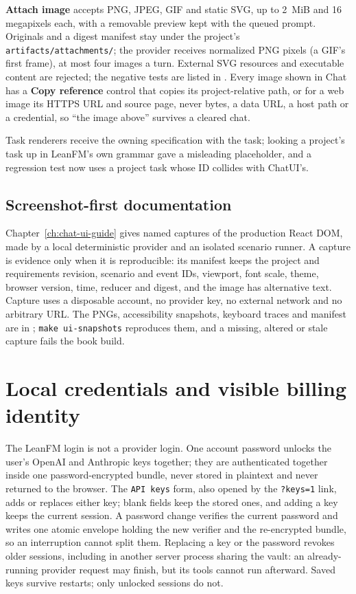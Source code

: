 \textbf{Attach image} accepts PNG, JPEG, GIF and static SVG, up to 2~MiB and 16
megapixels each, with a removable preview kept with the queued prompt. Originals
and a digest manifest stay under the project's \texttt{artifacts/attachments/};
the provider receives normalized PNG pixels (a GIF's first frame), at most four
images a turn. External SVG resources and executable content are rejected; the
negative tests are listed in . Every image
shown in Chat has a \textbf{Copy reference} control that copies its
project-relative path, or for a web image its HTTPS URL and source page, never
bytes, a data URL, a host path or a credential, so ``the image above'' survives a
cleared chat.

Task renderers receive the owning specification with the task; looking a
project's task up in LeanFM's own grammar gave a misleading placeholder, and a
regression test now uses a project task whose ID collides with ChatUI's.

\subsection{Screenshot-first documentation}

Chapter~\ref{ch:chat-ui-guide} gives named captures of the production React DOM,
made by a local deterministic provider and an isolated scenario runner. A capture
is evidence only when it is reproducible: its manifest keeps the project and
requirements revision, scenario and event IDs, viewport, font scale, theme,
browser version, time, reducer and digest, and the image has alternative text.
Capture uses a disposable account, no provider key, no external network and no
arbitrary URL. The PNGs, accessibility snapshots, keyboard traces and manifest
are in ; \texttt{make ui-snapshots} reproduces them,
and a missing, altered or stale capture fails the book build.

\section{Local credentials and visible billing identity}

The LeanFM login is not a provider login. One account password unlocks the
user's OpenAI and Anthropic keys together; they are authenticated together inside
one password-encrypted bundle, never stored in plaintext and never returned to the
browser. The \texttt{API keys} form, also opened by the \texttt{?keys=1} link,
adds or replaces either key; blank fields keep the stored ones, and adding a key
keeps the current session. A password change verifies the current password and
writes one atomic envelope holding the new verifier and the re-encrypted bundle,
so an interruption cannot split them. Replacing a key or the password revokes
older sessions, including in another server process sharing the vault: an
already-running provider request may finish, but its tools cannot run afterward.
Saved keys survive restarts; only unlocked sessions do not.

